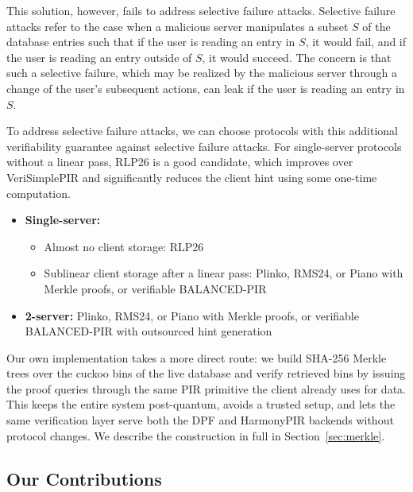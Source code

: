 This solution, however, fails to address selective failure attacks. Selective failure attacks refer to the case when a malicious server manipulates a subset $S$ of the database entries such that if the user is reading an entry in $S$, it would fail, and if the user is reading an entry outside of $S$, it would succeed. The concern is that such a selective failure, which may be realized by the malicious server through a change of the user's subsequent actions, can leak if the user is reading an entry in $S$.

To address selective failure attacks, we can choose protocols with this additional verifiability guarantee against selective failure attacks. For single-server protocols without a linear pass, RLP26 \cite{rlp26} is a good candidate, which improves over VeriSimplePIR \cite{cl24} and significantly reduces the client hint using some one-time computation.
\begin{itemize}[nolistsep,leftmargin=*]
    \item \textbf{Single-server:}
    \smallskip
    \begin{itemize}[nolistsep,leftmargin=*]
        \item Almost no client storage: RLP26 \cite{rlp26}

        \item Sublinear client storage after a linear pass: Plinko, RMS24, or Piano with Merkle proofs, or verifiable BALANCED-PIR \cite{ar26}
    \end{itemize}

    \smallskip
    \item \textbf{2-server:} Plinko, RMS24, or Piano with Merkle proofs, or verifiable BALANCED-PIR with outsourced hint generation
\end{itemize}

Our own implementation takes a more direct route: we build SHA-256 Merkle trees over the cuckoo bins of the live database and verify retrieved bins by issuing the proof queries through the same PIR primitive the client already uses for data. This keeps the entire system post-quantum, avoids a trusted setup, and lets the same verification layer serve both the DPF and HarmonyPIR backends without protocol changes. We describe the construction in full in Section~\ref{sec:merkle}.

\subsection{Our Contributions}

